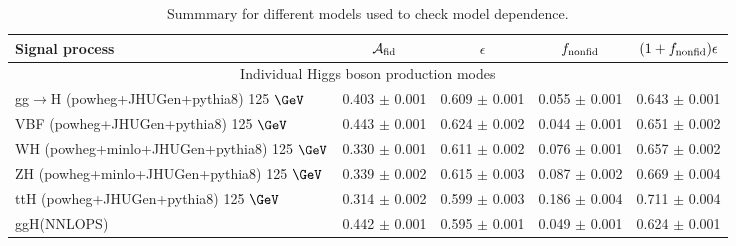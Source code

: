 \documentclass{article}
\begin{document}
\begin{table}[!h!tb]
\begin{center}
\small
\caption{
Summmary for different models used to check model dependence.
\label{tab:summaryExo}
}
\begin{tabular}{|l|c|c|c|c|} \hline \hline 
\textbf{Signal process} & $\mathcal{A}_{\rm fid}$ & $\epsilon$ & $f_{\rm nonfid}$  & $(1+f_{\rm nonfid})\epsilon$ \\ \hline \hline 
\multicolumn{5}{|c|}{Individual Higgs boson production modes} \\ \hline 
gg$\rightarrow$H ({\sc powheg+JHUGen+pythia8}) 125 $\GeV$ & 0.403 $\pm$ 0.001 & 0.609 $\pm$ 0.001 & 0.055 $\pm$ 0.001 & 0.643 $\pm$ 0.001 \\ 
 VBF ({\sc powheg+JHUGen+pythia8}) 125 $\GeV$ & 0.443 $\pm$ 0.001 & 0.624 $\pm$ 0.002 & 0.044 $\pm$ 0.001 & 0.651 $\pm$ 0.002 \\ 
 WH ({\sc powheg+minlo+JHUGen+pythia8}) 125 $\GeV$ & 0.330 $\pm$ 0.001 & 0.611 $\pm$ 0.002 & 0.076 $\pm$ 0.001 & 0.657 $\pm$ 0.002 \\ 
 ZH ({\sc powheg+minlo+JHUGen+pythia8}) 125 $\GeV$ & 0.339 $\pm$ 0.002 & 0.615 $\pm$ 0.003 & 0.087 $\pm$ 0.002 & 0.669 $\pm$ 0.004 \\ 
 ttH ({\sc powheg+JHUGen+pythia8}) 125 $\GeV$ & 0.314 $\pm$ 0.002 & 0.599 $\pm$ 0.003 & 0.186 $\pm$ 0.004 & 0.711 $\pm$ 0.004 \\ 
 ggH(NNLOPS) & 0.442 $\pm$ 0.001 & 0.595 $\pm$ 0.001 & 0.049 $\pm$ 0.001 & 0.624 $\pm$ 0.001 \\ 
 
\hline \hline
\end{tabular}
\normalsize
\end{center}
\end{table}
 
 
 
\end{document}
